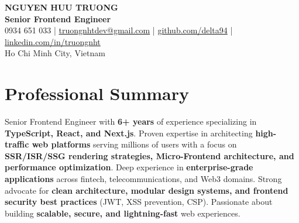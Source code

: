 \documentclass[a4paper,11pt]{article}
\begin{document}
\begin{center}
  {\Huge\textbf{NGUYEN HUU TRUONG}} \\[8pt]
  {\large\textbf{Senior Frontend Engineer}} \\[6pt]
  \small
  0934 651 033 \quad|\quad
  \href{mailto:truongnhtdev@gmail.com}{truongnhtdev@gmail.com} \quad|\quad
  \href{https://github.com/delta94}{github.com/delta94} \quad|\quad
  \href{https://linkedin.com/in/truongnht}{linkedin.com/in/truongnht} \\[2pt]
  Ho Chi Minh City, Vietnam
\end{center}

\section{Professional Summary}
Senior Frontend Engineer with \textbf{6+ years} of experience specializing in \textbf{TypeScript, React, and Next.js}. Proven expertise in architecting \textbf{high-traffic web platforms} serving millions of users with a focus on \textbf{SSR/ISR/SSG rendering strategies, Micro-Frontend architecture, and performance optimization}. Deep experience in \textbf{enterprise-grade applications} across fintech, telecommunications, and Web3 domains. Strong advocate for \textbf{clean architecture, modular design systems, and frontend security best practices} (JWT, XSS prevention, CSP). Passionate about building \textbf{scalable, secure, and lightning-fast} web experiences.

\end{document}
